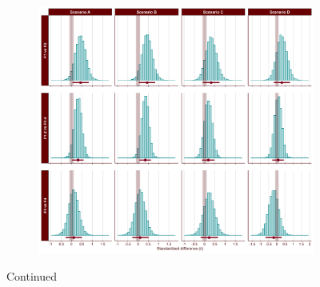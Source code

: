 \begin{appendix}
\begin{figure}[ht]\ContinuedFloat
    \centering
    \begin{subfigure}{1\textwidth}
        \includegraphics[width=\linewidth]{Figures/SC2_first_scenario_comparisons_C.png}
        \label{fig:first-scenario-comparisons-C}
    \end{subfigure}
    \caption[]{Continued}
    \label{fig:first-scenario-comparisons}
\end{figure}


\end{appendix}
